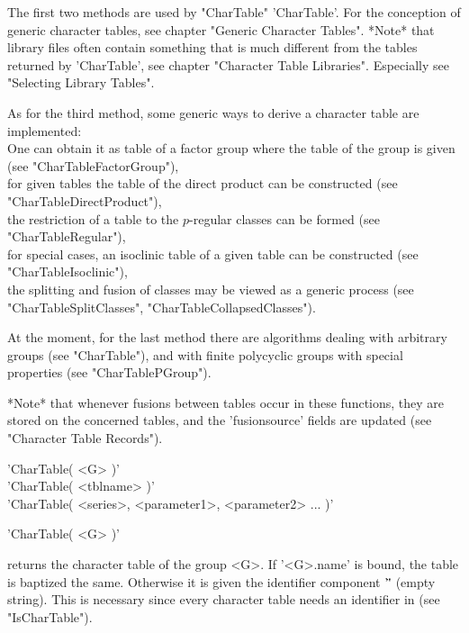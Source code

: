 The first two methods are used by "CharTable" 'CharTable'.
For the conception of generic character tables,
see chapter "Generic Character Tables".
*Note* that library files often contain something that is much different
from the tables returned by 'CharTable', see chapter "Character Table
Libraries".  Especially see "Selecting Library Tables".

As for the third method, some generic ways to derive a character table
are implemented\::\\
One can obtain it as table of a factor group where the table
      of the group is given (see "CharTableFactorGroup"),\\
for given tables the table of the direct product can be constructed
      (see "CharTableDirectProduct"),\\
the restriction of a table to the $p$-regular classes can be formed
      (see "CharTableRegular"),\\
for special cases, an isoclinic table of a given table can be
      constructed (see "CharTableIsoclinic"),\\
the splitting and fusion of classes may be viewed as a generic process
      (see "CharTableSplitClasses", "CharTableCollapsedClasses").

At the moment, for the last method there are algorithms dealing with
arbitrary groups (see "CharTable"), and with finite polycyclic groups
with special properties (see "CharTablePGroup").

*Note* that whenever fusions between tables occur in these functions,
they are stored on the concerned tables, and the 'fusionsource' fields
are updated (see "Character Table Records").

%
%
%
%

'CharTable( <G> )'\\
'CharTable( <tblname> )'\\
'CharTable( <series>, <parameter1>, <parameter2> ... )'

'CharTable( <G> )'

returns the  character table  of the group <G>.  If  '<G>.name' is bound,
the table is  baptized  the  same.  Otherwise  it is given the identifier
component '\"\"'
(empty string).  This  is necessary since every  character table needs an
identifier in {\GAP} (see "IsCharTable").

